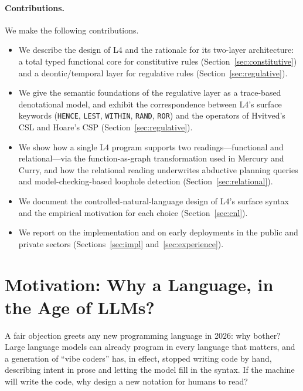 \documentclass[sigconf,nonacm]{acmart}
\newcommand{\code}[1]{\texttt{\small #1}}
\begin{document}
\paragraph{Contributions.} We make the following contributions.
\begin{itemize}
\item We describe the design of L4 and the rationale for its two-layer
  architecture: a total typed functional core for constitutive rules
  (Section~\ref{sec:constitutive}) and a deontic/temporal layer for
  regulative rules (Section~\ref{sec:regulative}).
\item We give the semantic foundations of the regulative layer as a
  trace-based denotational model, and exhibit the correspondence between
  L4's surface keywords (\code{HENCE}, \code{LEST}, \code{WITHIN},
  \code{RAND}, \code{ROR}) and the operators of Hvitved's CSL and Hoare's
  CSP (Section~\ref{sec:regulative}).
\item We show how a single L4 program supports two readings---functional
  and relational---via the function-as-graph transformation used in
  Mercury and Curry, and how the relational reading underwrites abductive
  planning queries and model-checking-based loophole detection
  (Section~\ref{sec:relational}).
\item We document the controlled-natural-language design of L4's surface
  syntax and the empirical motivation for each choice
  (Section~\ref{sec:cnl}).
\item We report on the implementation and on early deployments in the
  public and private sectors (Sections~\ref{sec:impl}
  and~\ref{sec:experience}).
\end{itemize}

\section{Motivation: Why a Language, in the Age of LLMs?}\label{sec:motivation}
A fair objection greets any new programming language in 2026: why bother?
Large language models can already program in every language that matters,
and a generation of ``vibe coders'' has, in effect, stopped writing code by
hand, describing intent in prose and letting the model fill in the
syntax. If the machine will write the code, why design a new notation for
humans to read?
\end{document}

